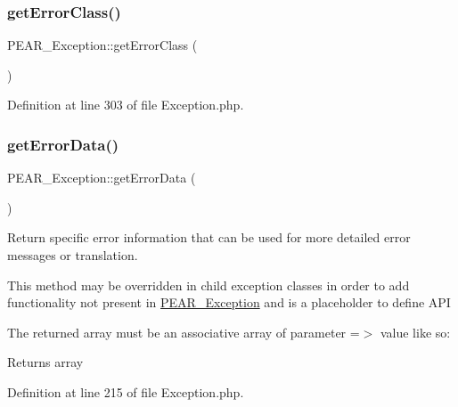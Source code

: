 \subsubsection{\texorpdfstring{get\+Error\+Class()}{getErrorClass()}}
{\footnotesize\ttfamily P\+E\+A\+R\+\_\+\+Exception\+::get\+Error\+Class (\begin{DoxyParamCaption}{ }\end{DoxyParamCaption})}



Definition at line 303 of file Exception.\+php.

\mbox{\label{classPEAR__Exception_a705ea5e6f32355245137f979221bf5c2}} 
\subsubsection{\texorpdfstring{get\+Error\+Data()}{getErrorData()}}
{\footnotesize\ttfamily P\+E\+A\+R\+\_\+\+Exception\+::get\+Error\+Data (\begin{DoxyParamCaption}{ }\end{DoxyParamCaption})}

Return specific error information that can be used for more detailed error messages or translation.

This method may be overridden in child exception classes in order to add functionality not present in \hyperlink{classPEAR__Exception}{P\+E\+A\+R\+\_\+\+Exception} and is a placeholder to define A\+PI

The returned array must be an associative array of parameter =$>$ value like so\+: 
 \begin{DoxyReturn}{Returns}
array 
\end{DoxyReturn}


Definition at line 215 of file Exception.\+php.

\mbox{\label{classPEAR__Exception_a423d0dcd3d908d2a39068a0893d17f22}} 

